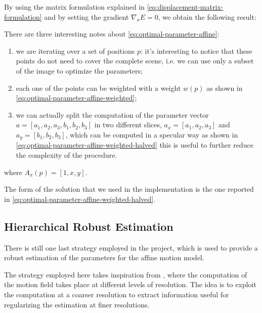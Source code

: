 By using the matrix formulation explained in \cref{eq:displacement-matrix-formulation} and by setting the gradient $\nabla_a E = 0$, we obtain the following result:

There are three interesting notes about \cref{eq:optimal-parameter-affine}:
\begin{enumerate}
    \item we are iterating over a set of positions $p$: it's interesting to notice that these points do not need to cover the complete scene, i.e. we can use only a subset of the image to optimize the parameters;
    \item each one of the points can be weighted with a weight $w(p)$ as shown in \cref{eq:optimal-parameter-affine-weighted};
    \item we can actually split the computation of the parameter vector $a = [a_1, a_2, a_3, b_1, b_2, b_3]$ in two different slices, $a_x = [a_1, a_2, a_3]$ and $a_y = [b_1, b_2, b_3]$, which can be computed in a specular way as shown in \cref{eq:optimal-parameter-affine-weighted-halved} this is useful to further reduce the complexity of the procedure.
\end{enumerate} 



where $A_x(p) = [1,x,y]$.

The form of the solution that we used in the implementation is the one reported in \cref{eq:optimal-parameter-affine-weighted-halved}.

\subsection{Hierarchical Robust Estimation}
There is still one last strategy employed in the project, which is used to provide a robust estimation of the parameters for the affine motion model.

The strategy employed here takes inspiration from \cite{Dufeaux2000}, where the computation of the motion field takes place at different levels of resolution. The idea is to exploit the computation at a coarser resolution to extract information useful for regularizing the estimation at finer resolutions.
